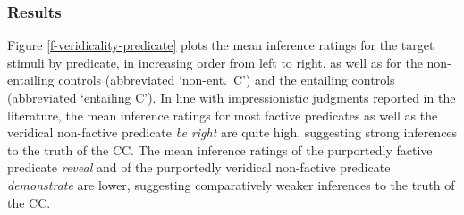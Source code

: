 \documentclass[11pt,fleqn]{article}
\newcommand{\6}{\mbox{$[\hspace*{-.6mm}[$}}
\newcommand{\9}{\mbox{$]\hspace*{-.6mm}]$}}
\begin{document}
\subsubsection{Results}


Figure \ref{f-veridicality-predicate} plots the mean inference ratings for the target stimuli by predicate, in increasing order from left to right, as well as for the non-entailing controls (abbreviated `non-ent.\ C') and the entailing controls (abbreviated `entailing C'). %
In line with impressionistic judgments reported in the literature, the mean inference ratings for most factive predicates as well as the veridical non-factive predicate {\em be right} are quite high, suggesting strong inferences to the truth of the CC. The mean inference ratings of the purportedly factive predicate {\em reveal} and of the purportedly veridical non-factive predicate {\em demonstrate} are lower, suggesting comparatively weaker inferences to the truth of the CC. 

\end{document}
